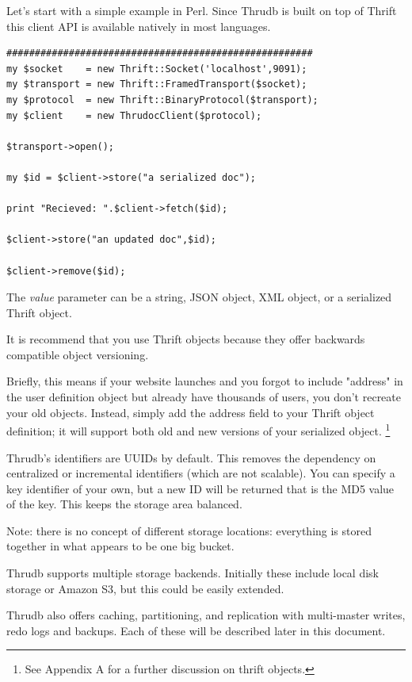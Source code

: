 \documentclass[nocopyrightspace,blockstyle]{sigplanconf}
\begin{document}
Let's start with a simple example in Perl. Since Thrudb is built on top of Thrift this client API is available natively in most languages.

\begin{verbatim}
######################################################
my $socket    = new Thrift::Socket('localhost',9091);
my $transport = new Thrift::FramedTransport($socket);
my $protocol  = new Thrift::BinaryProtocol($transport);
my $client    = new ThrudocClient($protocol);

$transport->open();

my $id = $client->store("a serialized doc");

print "Recieved: ".$client->fetch($id);

$client->store("an updated doc",$id);

$client->remove($id);

\end{verbatim}

The \textit{value} parameter can be a string, JSON object, XML object, or a serialized Thrift object.

It is recommend that you use Thrift objects because they offer backwards compatible object versioning.

Briefly, this means if your website launches and you forgot to include "address" in the user definition object
 but already have thousands of users, you don't recreate your old objects. Instead, simply add the address field
to your Thrift object definition; it will support both old and new versions of your serialized object.
\footnote{See Appendix A for a further discussion on thrift objects.}

Thrudb's identifiers are UUIDs by default. This removes the dependency on centralized or incremental identifiers (which are not scalable).
You can specify a key identifier of your own, but a new ID will be returned that is the MD5 value of the key.
This keeps the storage area balanced.

Note: there is no concept of different storage locations: everything is stored together in what appears to be one big bucket.

Thrudb supports multiple storage backends.  Initially these include local disk storage or Amazon S3, but this could be easily extended.

Thrudb also offers caching, partitioning, and replication with multi-master writes, redo logs and backups. Each of these
will be described later in this document.
\end{document}

